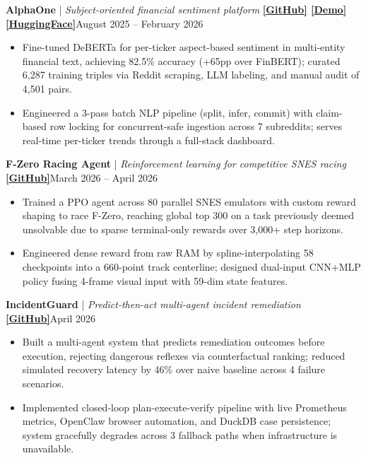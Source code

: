 \documentclass[10pt,letterpaper]{article}
\begin{document}
\textbf{AlphaOne} \;|\; \textit{Subject-oriented financial sentiment platform} \textbf{\href{https://github.com/ArtysicistZ/AlphaOne.git}{[GitHub]} \href{https://artysicistz.github.io/projects/alphaone-demo.html}{[Demo]} \href{https://huggingface.co/ArtysicistZ/deberta-absa-v2}{[HuggingFace]}}\hfill August 2025 -- February 2026
\begin{itemize}
    \item Fine-tuned DeBERTa for per-ticker aspect-based sentiment in multi-entity financial text, achieving 82.5\% accuracy (+65pp over FinBERT); curated 6,287 training triples via Reddit scraping, LLM labeling, and manual audit of 4,501 pairs.
    \item Engineered a 3-pass batch NLP pipeline (split, infer, commit) with claim-based row locking for concurrent-safe ingestion across 7 subreddits; serves real-time per-ticker trends through a full-stack dashboard.
\end{itemize}
\vspace{1pt}
\textbf{F-Zero Racing Agent} \;|\; \textit{Reinforcement learning for competitive SNES racing} \textbf{\href{https://github.com/ArtysicistZ/FZero}{[GitHub]}}\hfill March 2026 -- April 2026
\begin{itemize}
    \item Trained a PPO agent across 80 parallel SNES emulators with custom reward shaping to race F-Zero, reaching global top 300 on a task previously deemed unsolvable due to sparse terminal-only rewards over 3,000+ step horizons.
    \item Engineered dense reward from raw RAM by spline-interpolating 58 checkpoints into a 660-point track centerline; designed dual-input CNN+MLP policy fusing 4-frame visual input with 59-dim state features.
\end{itemize}
\vspace{1pt}
\textbf{IncidentGuard} \;|\; \textit{Predict-then-act multi-agent incident remediation} \textbf{\href{https://github.com/hanshengzhu0001/stratusxpennai}{[GitHub]}}\hfill April 2026
\begin{itemize}
    \item Built a multi-agent system that predicts remediation outcomes before execution, rejecting dangerous reflexes via counterfactual ranking; reduced simulated recovery latency by 46\% over naive baseline across 4 failure scenarios.
    \item Implemented closed-loop plan-execute-verify pipeline with live Prometheus metrics, OpenClaw browser automation, and DuckDB case persistence; system gracefully degrades across 3 fallback paths when infrastructure is unavailable.
\end{itemize}
\end{document}
